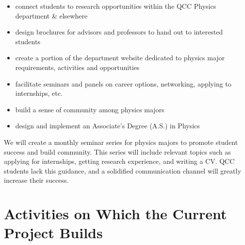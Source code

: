 \documentclass[12pt]{article}
\begin{document}
\begin{itemize}
\setlength{\itemsep}{-\parsep}
\setlength{\topsep}{-\parsep}
\setlength{\partopsep}{-\parsep}
	\item connect students to research opportunities within the QCC Physics department \& elsewhere
	\item design brochures for advisors and professors to hand out to interested students
	\item create a portion of the department website dedicated to physics major requirements, activities and opportunities
	\item facilitate seminars and panels on career options, networking, applying to internships, etc.
	\item build a sense of community among physics majors 
	\item design and implement an Associate's Degree (A.S.) in Physics
\end{itemize}	
	
We will create a monthly seminar series for physics majors to promote student success and build community.  This series will include relevant topics such as applying for internships, getting research experience, and writing a CV.  QCC students lack this guidance, and a solidified communication channel will greatly increase their success.


\section{Activities on Which the Current Project Builds}

\end{document}
